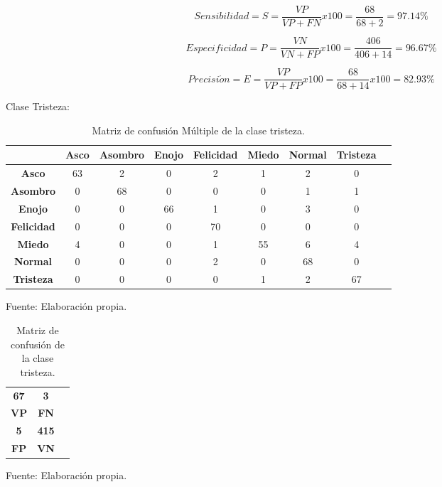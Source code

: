 \begin{equation}
Sensibilidad=S=\frac{VP}{VP+FN}x100=\frac{68}{68+2}=97.14\%
\end{equation}

\begin{equation}
Especificidad=P=\frac{VN}{VN+FP}x100=\frac{406}{406+14}=96.67\%
\end{equation}

\begin{equation}
Precisi\acute{o}n=E=\frac{VP}{VP+FP}x100=\frac{68}{68+14}x100=82.93\%
\end{equation}

\vskip 5cm

Clase Tristeza:

\begin{table}[ht!]
\centering
\caption{Matriz de confusión Múltiple de la clase tristeza.} \vskip 0.1cm
\begin{tabular}{|c|c|c|c|c|c|c|c|c|} \hline
 & \bf Asco & \bf Asombro & \bf Enojo & \bf Felicidad & \bf Miedo & \bf Normal & \bf Tristeza \\ \hline
\bf Asco & 63 & 2 & 0 & 2 & 1 & 2 & 0 \\ \hline
\bf Asombro & 0 & 68 & 0 & 0 & 0 & 1 & 1 \\ \hline
\bf Enojo & 0 & 0 & 66 & 1 & 0 & 3 & 0 \\ \hline
\bf Felicidad & 0 & 0 & 0 & 70 & 0 & 0 & 0 \\ \hline
\bf Miedo & 4 & 0 & 0 & 1 & 55 & 6 & 4 \\ \hline
\bf Normal & 0 & 0 & 0 & 2 & 0 & 68 & 0 \\ \hline
\bf Tristeza & 0 & 0 & 0 & 0 & 1 & 2 & 67 \\ \hline

\end{tabular}
\begin{center}
{\small{Fuente: Elaboración propia.}}
\end{center}
\end{table}

\begin{table}[ht!]
\centering
\caption{Matriz de confusión de la clase tristeza.} \vskip 0.1cm
\begin{tabular}{|c|c|c|} \hline
\bf 67 \par & \bf 3 \par \\
\bf VP & \bf FN \\ \hline
\bf 5 \par & \bf 415 \par \\ 
\bf FP & \bf VN \\ \hline 
\end{tabular}
\begin{center}
{\small{Fuente: Elaboración propia.}}
\end{center}
\end{table}

